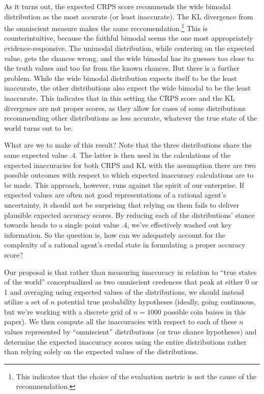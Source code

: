 \documentclass[
  letterpaper,
  DIV=11,
  numbers=noendperiod]{scrartcl}
\begin{document}
As it turns out, the expected CRPS score recommends the wide bimodal
distribution as the most accurate (or least inaccurate). The KL
divergence from the omniscient measure makes the same
reccomendation.\footnote{This indicates that the choice of the
  evaluation metric is not the cause of the recommendation.} This is
counterintuitive, because the faithful bimodal seems the one most
appropriately evidence-responsive. The unimodal distribution, while
centering on the expected value, gets the chances wrong, and the wide
bimodal has its guesses too close to the truth values and too far from
the known chances. But there is a further problem. While the wide
bimodal distribution expects itself to be the least inaccurate, the
other distributions also expect the wide bimodal to be the least
inaccurate. This indicates that in this setting the CRPS score and the
KL divergence are not proper scores, as they allow for cases of some
distributions recommending other distributions as less accurate,
whatever the true state of the world turns out to be.

What are we to make of this result? Note that the three distributions
share the same expected value \(.4\). The latter is then used in the
calculations of the expected inaccuracies for both CRPS and KL with the
assumption there are two possible outcomes with respect to which
expected inaccuracy calculations are to be made. This approach, however,
runs against the spirit of our enterprise. If expected values are often
not good representations of a rational agent's uncertainty, it should
not be surprising that relying on them fails to deliver plausible
expected accuracy scores. By reducing each of the distributions' stance
towards heads to a single point value .4, we've effectively washed out
key information. So the question is, how can we adequately account for
the complexity of a rational agent's credal state in formulating a
proper accuracy score?

Our proposal is that rather than measuring inaccuracy in relation to
``true states of the world'' conceptualized as two omniscient credences
that peak at either 0 or 1 and averaging using expected values of the
distributions, we should instead utilize a set of \(n\) potential true
probability hypotheses (ideally, going continuous, but we're working
with a discrete grid of \(n=1000\) possible coin baises in this paper).
We then compute all the inaccuracies with respect to each of these \(n\)
values represented by ``omniscient'' distributions (or true chance
hypotheses) and determine the expected inaccuracy scores using the
entire distributions rather than relying solely on the expected values
of the distributions.
\end{document}
